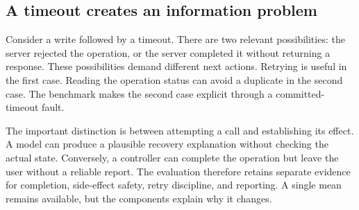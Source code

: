 \documentclass{article}
\begin{document}
\subsection{A timeout creates an information problem}
Consider a write followed by a timeout. There are two relevant possibilities: the server rejected the operation, or the server completed it without returning a response. These possibilities demand different next actions. Retrying is useful in the first case. Reading the operation status can avoid a duplicate in the second case. The benchmark makes the second case explicit through a committed-timeout fault.\par
The important distinction is between attempting a call and establishing its effect. A model can produce a plausible recovery explanation without checking the actual state. Conversely, a controller can complete the operation but leave the user without a reliable report. The evaluation therefore retains separate evidence for completion, side-effect safety, retry discipline, and reporting. A single mean remains available, but the components explain why it changes.\par
\end{document}
